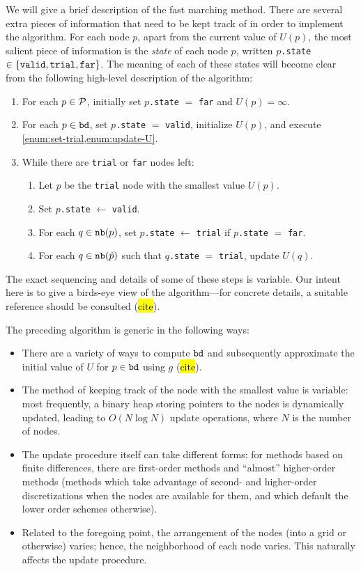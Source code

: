 \documentclass[eikonal.tex]{subfiles}
\begin{document}
We will give a brief description of the fast marching method. There
are several extra pieces of information that need to be kept track of
in order to implement the algorithm. For each node $p$, apart from the
current value of $U(p)$, the most salient piece of information is the
\emph{state} of each node $p$, written $p$\texttt{.state}
$\in \left\{\texttt{valid}, \texttt{trial}, \texttt{far}\right\}$. The meaning
of each of these states will become clear from the following
high-level description of the algorithm:
\begin{enumerate}
\item For each $p \in \mathcal{P}$, initially set $p$\texttt{.state} $=$
  \texttt{far} and $U(p) = \infty$.
\item For each $p \in \texttt{bd}$, set $p$\texttt{.state} $=$
  \texttt{valid}, initialize $U(p)$, and execute
  \cref{enum:set-trial,enum:update-U}.
\item While there are \texttt{trial} or \texttt{far} nodes left:
  \begin{enumerate}
  \item Let $p$ be the \texttt{trial} node with the smallest value
    $U(p)$.
  \item Set $p$\texttt{.state} $\gets$ \texttt{valid}.
  \item For each $q \in \texttt{nb}(p)$, set $p$\texttt{.state} $\gets$
    \texttt{trial} if $p$\texttt{.state} $=$
    \texttt{far}.\label{enum:set-trial}
  \item For each $q \in \texttt{nb}(\hat{p})$ such that $q$\texttt{.state}
    $=$ \texttt{trial}, update $U(q)$.\label{enum:update-U}
  \end{enumerate}
\end{enumerate}
The exact sequencing and details of some of these steps is
variable. Our intent here is to give a birds-eye view of the
algorithm---for concrete details, a suitable reference should be
consulted (\hl{cite}).

The preceding algorithm is generic in the following ways:
\begin{itemize}
\item There are a variety of ways to compute $\texttt{bd}$ and
  subsequently approximate the initial value of $U$ for
  $p \in \texttt{bd}$ using $g$ (\hl{cite}).
\item The method of keeping track of the node with the smallest value
  is variable: most frequently, a binary heap storing pointers to the
  nodes is dynamically updated, leading to $O(N \log N)$ update
  operations, where $N$ is the number of nodes.
\item The update procedure itself can take different forms: for
  methods based on finite differences, there are first-order methods
  and ``almost'' higher-order methods (methods which take advantage of
  second- and higher-order discretizations when the nodes are
  available for them, and which default the lower order schemes
  otherwise).
\item Related to the foregoing point, the arrangement of the nodes
  (into a grid or otherwise) varies; hence, the neighborhood of each
  node varies. This naturally affects the update procedure.
\end{itemize}
\end{document}
